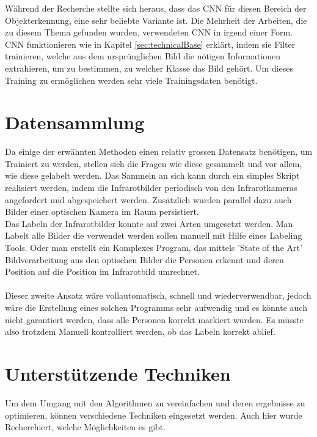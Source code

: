Während der Recherche stellte sich heraus, dass das \gls{CNN} für diesen Bereich der Objekterkennung, eine sehr beliebte Variante ist. Die Mehrheit der Arbeiten, die zu diesem Thema gefunden wurden, verwendeten \gls{CNN} in irgend einer Form.\\
\gls{CNN} funktionieren wie in Kapitel \ref{sec:technicalBase} erklärt, indem sie Filter trainieren, welche aus dem ursprünglichen Bild die nötigen Informationen extrahieren, um zu bestimmen, zu welcher Klasse das Bild gehört. Um dieses Training zu ermöglichen werden sehr viele Trainingsdaten benötigt.


\section{Datensammlung}

Da einige der erwähnten Methoden einen relativ grossen Datensatz benötigen, um Trainiert zu werden, stellen sich die Fragen wie diese gesammelt und vor allem, wie diese gelabelt werden. Das Sammeln an sich kann durch ein simples Skript realisiert werden, indem die Infrarotbilder periodisch von den Infrarotkameras angefordert und abgespeichert werden. Zusätzlich wurden parallel dazu auch Bilder einer optischen Kamera im Raum persistiert.\\
Das Labeln der Infrarotbilder konnte auf zwei Arten umgesetzt werden. Man Labelt alle Bilder die verwendet werden sollen manuell mit Hilfe eines Labeling Tools. Oder man erstellt ein Komplexes Program, das mittels 'State of the Art' Bildverarbeitung aus den optischen Bilder die Personen erkennt und deren Position auf die Position im Infrarotbild umrechnet.\\
\\
Dieser zweite Ansatz wäre vollautomatisch, schnell und wiederverwendbar, jedoch wäre die Erstellung eines solchen Programms sehr aufwendig und es könnte auch nicht garantiert werden, dass alle Personen korrekt markiert wurden. Es müsste also trotzdem Manuell kontrolliert werden, ob das Labeln korrekt ablief. 


\section{Unterstützende Techniken}

Um dem Umgang mit den Algorithmen zu vereinfachen und deren ergebnisse zu optimieren, können verschiedene Techniken eingesetzt werden. Auch hier wurde Recherchiert, welche Möglichkeiten es gibt.


